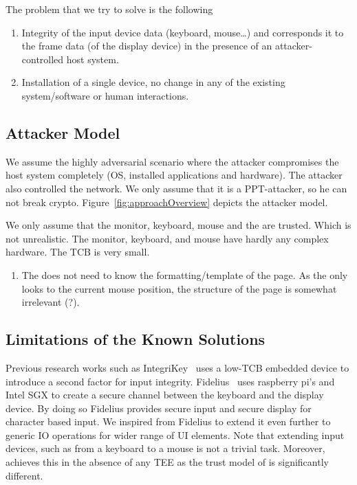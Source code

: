 The problem that we try to solve is the following

\begin{enumerate}
  \item Integrity of the input device data (keyboard, mouse\ldots) and corresponds it to the frame data (of the display device) in the presence of an attacker-controlled host system.
  \item Installation of a single device, no change in any of the existing system/software or human interactions.
\end{enumerate}

\subsection{Attacker Model}

We assume the highly adversarial scenario where the attacker compromises the host system completely (OS, installed applications and hardware). The attacker also controlled the network. We only assume that it is a PPT-attacker, so he can not break crypto. Figure~\ref{fig:approachOverview} depicts the attacker model.

We only assume that the monitor, keyboard, mouse and the \device are trusted. Which is not unrealistic. The monitor, keyboard, and mouse have hardly any complex hardware. The TCB is very small.


\begin{enumerate}
  \item The \device does not need to know the formatting/template of the page. As the \device only looks to the current mouse position, the structure of the page is somewhat irrelevant (?).
\end{enumerate}

\subsection{Limitations of the Known Solutions}

Previous research works such as IntegriKey~\cite{IntegriKey} uses a low-TCB embedded device to introduce a second factor for input integrity. Fidelius~\cite{Fidelius} uses raspberry pi's and Intel SGX to create a secure channel between the keyboard and the display device. By doing so Fidelius provides secure input and secure display for character based input. We inspired from Fidelius to extend it even further to generic IO operations for wider range of UI elements. Note that extending input devices, such as from a keyboard to a mouse is not a trivial task. Moreover, \name achieves this in the absence of any TEE as the trust model of \name is significantly different. 




